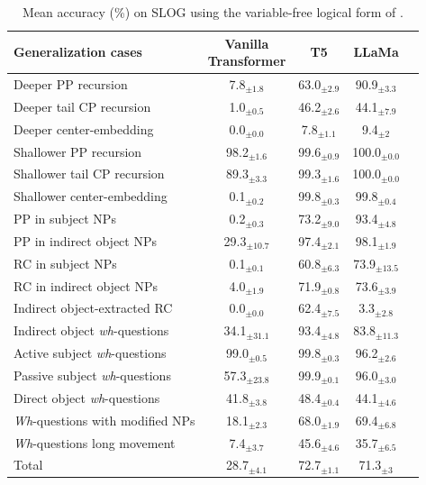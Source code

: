  \label{app:varfree_res}
\begin{table}[ht]
    \centering
    \begin{tabular}{lcccc}
    \toprule
    Generalization cases & \makecell[c]{Vanilla \\ Transformer} & T5  & LLaMa  \\
    \midrule
    Deeper PP recursion & 7.8$_{\pm 1.8}$ & 63.0$_{\pm 2.9}$ & 90.9$_{\pm 3.3}$ \\
    Deeper tail CP recursion & 1.0$_{\pm 0.5}$ & 46.2$_{\pm 2.6}$ & 44.1$_{\pm 7.9}$ \\
    Deeper center-embedding & 0.0$_{\pm 0.0}$ & 7.8$_{\pm 1.1}$ & 9.4$_{\pm 2}$ \\
    Shallower PP recursion & 98.2$_{\pm 1.6}$ & 99.6$_{\pm 0.9}$ & 100.0$_{\pm 0.0}$ \\
    Shallower tail CP recursion & 89.3$_{\pm 3.3}$ & 99.3$_{\pm 1.6}$ & 100.0$_{\pm 0.0}$ \\
    Shallower center-embedding & 0.1$_{\pm 0.2}$ & 99.8$_{\pm 0.3}$ & 99.8$_{\pm 0.4}$ \\

    \midrule
    PP in subject NPs & 0.2$_{\pm 0.3}$ & 73.2$_{\pm 9.0}$ & 93.4$_{\pm 4.8}$ \\
    PP in indirect object NPs & 29.3$_{\pm 10.7}$ & 97.4$_{\pm 2.1}$ & 98.1$_{\pm 1.9}$ \\
    RC in subject NPs & 0.1$_{\pm 0.1}$ & 60.8$_{\pm 6.3}$ & 73.9$_{\pm 13.5}$ \\
    RC in indirect object NPs & 4.0$_{\pm 1.9}$ & 71.9$_{\pm 0.8}$ & 73.6$_{\pm 3.9}$ \\
    \midrule
    Indirect object-extracted RC & 0.0$_{\pm 0.0}$ & 62.4$_{\pm 7.5}$ & 3.3$_{\pm 2.8}$ \\
    Indirect object \textit{wh}-questions & 34.1$_{\pm 31.1}$ & 93.4$_{\pm 4.8}$ & 83.8$_{\pm 11.3}$ \\
    \midrule
    Active subject \textit{wh}-questions & 99.0$_{\pm 0.5}$ & 99.8$_{\pm 0.3}$ & 96.2$_{\pm 2.6}$ \\
    Passive subject \textit{wh}-questions & 57.3$_{\pm 23.8}$ & 99.9$_{\pm 0.1}$ & 96.0$_{\pm 3.0}$ \\
    Direct object \textit{wh}-questions & 41.8$_{\pm 3.8}$ & 48.4$_{\pm 0.4}$ & 44.1$_{\pm 4.6}$ \\
    \textit{Wh}-questions with modified NPs & 18.1$_{\pm 2.3}$ & 68.0$_{\pm 1.9}$ & 69.4$_{\pm 6.8}$ \\
    \textit{Wh}-questions long movement & 7.4$_{\pm 3.7}$ & 45.6$_{\pm 4.6}$ & 35.7$_{\pm 6.5}$ \\
    \midrule
    Total & 28.7$_{\pm 4.1}$ & 72.7$_{\pm 1.1}$ & 71.3$_{\pm 3}$ \\
    \bottomrule
    \end{tabular}
    \caption{Mean accuracy (\%) on SLOG using the variable-free logical form of \citet{qiu-etal-2022-improving}.}
    \label{tab:res_cases_varfree}
\end{table}

